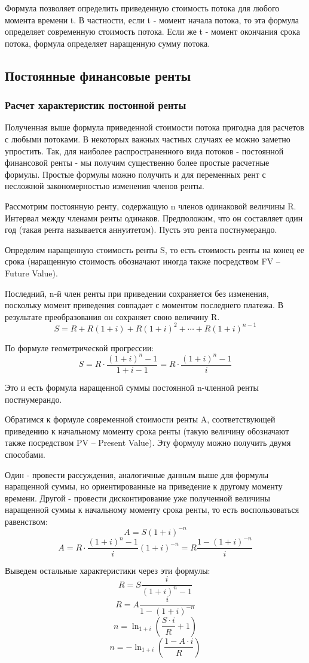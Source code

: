 \documentclass[aps,%
12pt,%
final,%
oneside,
onecolumn,%
musixtex, %
superscriptaddress,%
centertags]{article} %
\begin{document}
Формула позволяет определить приведенную стоимость потока для любого момента времени t. В частности, если t - момент начала потока, то эта формула определяет современную стоимость потока. Если же t - момент окончания срока потока, формула определяет наращенную сумму потока.

\subsection{Постоянные финансовые ренты}
\subsubsection{Расчет характеристик постонной ренты}

Полученная выше формула приведенной стоимости потока пригодна для расчетов с любыми потоками. В некоторых важных частных случаях ее можно заметно упростить. Так, для наиболее распространенного вида потоков - постоянной финансовой ренты - мы получим существенно более простые расчетные формулы. Простые формулы можно получить и для переменных рент с несложной закономерностью изменения членов ренты.

Рассмотрим постоянную ренту, содержащую n членов одинаковой величины R. Интервал между членами ренты одинаков. Предположим, что он составляет один год (такая рента называется аннуитетом). Пусть это рента постнумерандо.

Определим наращенную стоимость ренты S, то есть стоимость ренты на конец ее срока (наращенную стоимость обозначают иногда также посредством FV – Future Value).

Последний, n-й член ренты при приведении сохраняется без изменения, поскольку момент приведения совпадает с моментом последнего платежа. В результате преобразования он сохраняет свою величину R.
$$ S = R + R(1+i) + R(1+i)^2 + \cdots + R(1+i)^{n-1}$$

По формуле геометрической прогрессии:
$$ S = R \cdot \frac{(1+i)^n - 1 }{1+i-1} = R \cdot \frac{(1+i)^n - 1 }{i} $$

Это и есть формула наращенной суммы постоянной n-членной ренты постнумерандо. 

Обратимся к формуле современной стоимости ренты A, соответствующей приведению к начальному моменту срока ренты (такую величину обозначают также посредством PV – Present Value). Эту формулу можно получить двумя способами.

Один - провести рассуждения, аналогичные данным выше для формулы наращенной суммы, но ориентированные на приведение к другому моменту времени. Другой - провести дисконтирование уже полученной величины наращенной суммы к начальному моменту срока ренты, то есть воспользоваться равенством:
$$ A  = S(1+i)^{-n}$$
$$ A = R \cdot \frac{(1+i)^n - 1 }{i} (1+i)^{-n} = R \frac {1-(1+i)^{-n}}{i}$$

Выведем остальные характеристики через эти формулы:
$$ R = S \frac{i}{(1+i)^n - 1}$$
$$ R = A \frac {i}{1-(1+i)^{-n}}$$
$$ n = \ln_{1+i} \left(\frac{S \cdot i}{R} + 1 \right)$$
$$ n =-  \ln_{1+i} \left(\frac{1 - A \cdot i}{R}  \right)$$
\end{document}
